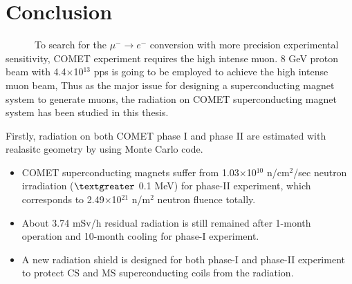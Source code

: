 %
%

\chapter{Conclusion}
~~~~~~To search for the $\mu^- \rightarrow e^-$ conversion with more precision experimental sensitivity, COMET experiment requires the high intense muon.
8 GeV proton beam with 4.4$\times$10$^{13}$ pps is going to be employed to achieve the high intense muon beam, Thus as the major issue for designing a superconducting magnet system to generate muons, the radiation on COMET superconducting magnet system has been studied in this thesis.

Firstly, radiation on both COMET phase I and phase II are estimated with realasitc geometry by using Monte Carlo code.
\begin{itemize}
 \setlength{\itemsep}{-5pt}
 \item COMET superconducting magnets suffer from 1.03$\times$10$^{10}$ n/cm$^2$/sec neutron irradiation ($\textgreater$ 0.1 MeV) for phase-II experiment, which corresponds to 2.49$\times$10$^{21}$ n/m$^2$ neutron fluence totally.
 \item About 3.74 mSv/h residual radiation is still remained after 1-month operation and 10-month cooling for phase-I experiment.
 \item A new radiation shield is designed for both phase-I and phase-II experiment to protect CS and MS superconducting coils from the radiation.
\end{itemize}

